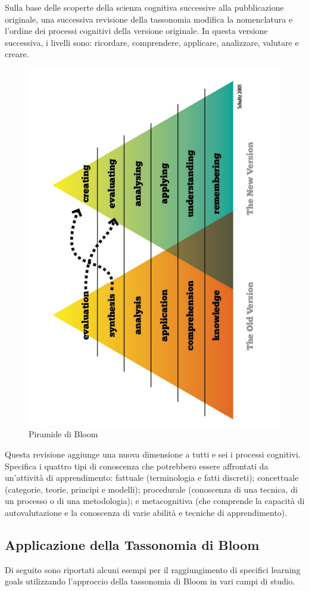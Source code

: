 Sulla base delle scoperte della scienza cognitiva successive alla pubblicazione originale, una successiva revisione della tassonomia modifica la nomenclatura e l'ordine dei processi cognitivi della versione originale. In questa versione successiva, i livelli sono: ricordare, comprendere, applicare, analizzare, valutare e creare.
\begin{figure}[h!]
  \centerline{\includegraphics[height = 9 cm, width= 6 cm, angle=270]{figures/BloomNew.pdf}}
  \caption{Piramide di Bloom}
\end{figure}
Questa revisione aggiunge una nuova dimensione a tutti e sei i processi cognitivi. Specifica i quattro tipi di conoscenza che potrebbero essere affrontati da un'attività di apprendimento: fattuale (terminologia e fatti discreti); concettuale (categorie, teorie, principi e modelli); procedurale (conoscenza di una tecnica, di un processo o di una metodologia); e metacognitiva (che comprende la capacità di autovalutazione e la conoscenza di varie abilità e tecniche di apprendimento).

\subsection{Applicazione della Tassonomia di Bloom}
Di seguito sono riportati alcuni esempi per il raggiungimento di specifici learning goals utilizzando l’approccio della tassonomia di Bloom in vari campi di studio.
\\
\\


